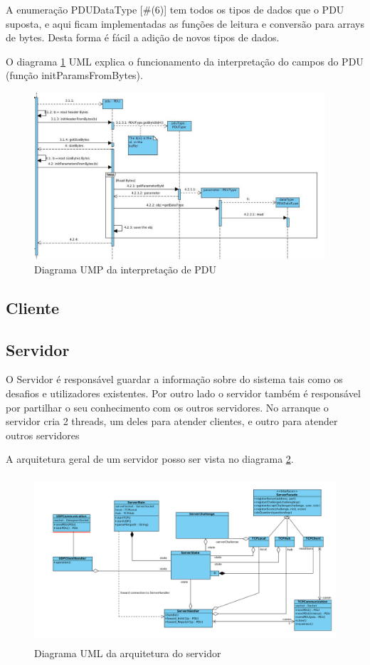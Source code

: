 \documentclass[runningheads,a4paper]{llncs}
\begin{document}
A enumeração PDUDataType [\#(6)] tem todos os tipos de dados que o PDU suposta, e aqui ficam implementadas as funções de leitura e conversão para arrays de bytes.
Desta forma é fácil a adição de novos tipos de dados.

O diagrama \ref{fig:diagram-pdu} UML explica o funcionamento da interpretação do campos do PDU (função initParamsFromBytes).

\begin{figure}
\centering
\includegraphics[height=6.2cm]{PDU_interpretation.jpg}
\caption{Diagrama UMP da interpretação de PDU}
\label{fig:diagram-pdu}
\end{figure}

\subsection{Cliente}

\subsection{Servidor}

O Servidor é responsável guardar a informação sobre do sistema tais como os desafios e utilizadores existentes. Por outro lado o servidor também é responsável por partilhar o seu conhecimento com os outros servidores.
No arranque o servidor cria 2 threads, um deles para atender clientes, e outro para atender outros  servidores 

A arquitetura geral de um servidor posso ser vista no diagrama \ref{fig:diagram-arq-geral}.

\begin{figure}
\centering
\includegraphics[height=6.2cm]{arq-geral.png}
\caption{Diagrama UML da arquitetura do servidor}
\label{fig:diagram-arq-geral}
\end{figure}
\end{document}
